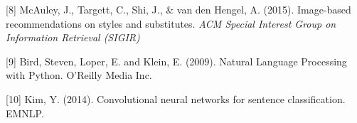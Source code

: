 \documentclass{article} %
\begin{document}
{%




[8] McAuley, J., Targett, C., Shi, J., \& van den Hengel, A. (2015). Image-based recommendations on styles and substitutes. {\it ACM Special Interest Group on Information Retrieval (SIGIR)}

[9] Bird, Steven, Loper, E. and Klein, E. (2009). Natural Language Processing with Python. O'Reilly Media Inc.

[10] Kim, Y. (2014). Convolutional neural networks for sentence classification. EMNLP.



%
%



}
\end{document}

